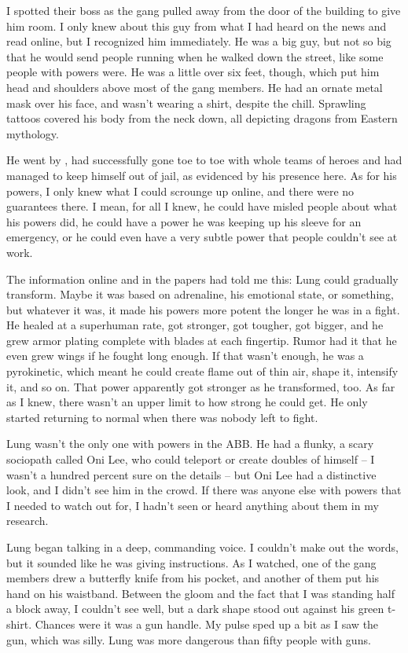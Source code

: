 I spotted their boss as the gang pulled away from the door of the building to give him room. I only knew about this guy from what I had heard on the news and read online, but I recognized him immediately. He was a big guy, but not so big that he would send people running when he walked down the street, like some people with powers were. He was a little over six feet, though, which put him head and shoulders above most of the gang members. He had an ornate metal mask over his face, and wasn't wearing a shirt, despite the chill. Sprawling tattoos covered his body from the neck down, all depicting dragons from Eastern mythology.

He went by , had successfully gone toe to toe with whole teams of heroes and had managed to keep himself out of jail, as evidenced by his presence here. As for his powers, I only knew what I could scrounge up online, and there were no guarantees there. I mean, for all I knew, he could have misled people about what his powers did, he could have a power he was keeping up his sleeve for an emergency, or he could even have a very subtle power that people couldn't see at work.

The information online and in the papers had told me this: Lung could gradually transform. Maybe it was based on adrenaline, his emotional state, or something, but whatever it was, it made his powers more potent the longer he was in a fight. He healed at a superhuman rate, got stronger, got tougher, got bigger, and he grew armor plating complete with blades at each fingertip. Rumor had it that he even grew wings if he fought long enough. If that wasn't enough, he was a pyrokinetic, which meant he could create flame out of thin air, shape it, intensify it, and so on. That power apparently got stronger as he transformed, too. As far as I knew, there wasn't an upper limit to how strong he could get. He only started returning to normal when there was nobody left to fight.

Lung wasn't the only one with powers in the ABB. He had a flunky, a scary sociopath called Oni Lee, who could teleport or create doubles of himself -- I wasn't a hundred percent sure on the details -- but Oni Lee had a distinctive look, and I didn't see him in the crowd. If there was anyone else with powers that I needed to watch out for, I hadn't seen or heard anything about them in my research.

Lung began talking in a deep, commanding voice. I couldn't make out the words, but it sounded like he was giving instructions. As I watched, one of the gang members drew a butterfly knife from his pocket, and another of them put his hand on his waistband. Between the gloom and the fact that I was standing half a block away, I couldn't see well, but a dark shape stood out against his green t-shirt. Chances were it was a gun handle. My pulse sped up a bit as I saw the gun, which was silly. Lung was more dangerous than fifty people with guns.

